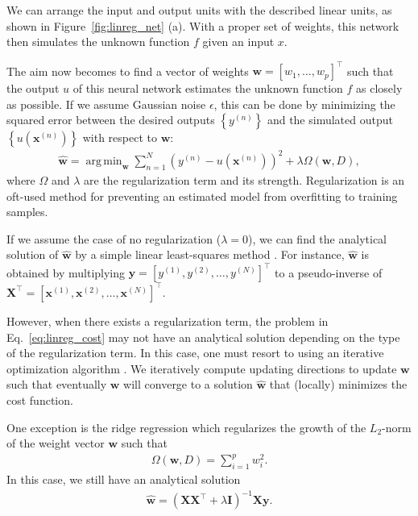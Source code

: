 \documentclass[dissertation,nocontribution,draft*]{aaltoseries}
\newcommand{\vect}[1]{\mathbf{#1}}
\newcommand{\matr}[1]{\mathbf{#1}}
\newcommand{\vx}[0]{\vect{x}}
\newcommand{\vy}[0]{\vect{y}}
\newcommand{\vw}[0]{\vect{w}}
\newcommand{\mX}[0]{\matr{X}}
\newcommand{\mI}{\matr{I}}
\DeclareMathOperator*{\argmin}{arg\,min}
\begin{document}
We can arrange the input and output units with the described
linear units, as shown in Figure~\ref{fig:linreg_net} (a). With
a proper set of weights, this network then simulates
the unknown function $f$ given an input $x$. 

The aim now becomes to find a vector of weights $\vw = [w_1,
\dots, w_p]^\top$ such that the output $u$ of this neural
network estimates the unknown function $f$ as closely as
possible. If we assume Gaussian noise $\epsilon$, this can
be done by minimizing the squared error between the desired
outputs $\left\{ y^{(n)} \right\}$ and the simulated output
$\left\{ u(\vx^{(n)}) \right\}$ with respect to $\vw$:
\begin{align}
    \label{eq:linreg_cost}
    \hat{\vw} = \argmin_{\vw} \sum_{n=1}^N \left( y^{(n)}
    - u\left(\vx^{(n)}\right) \right)^2 + \lambda \Omega
    \left(\vw, D\right),
\end{align}
where $\Omega$ and $\lambda$ are the regularization term and
its strength. Regularization is an oft-used method for
preventing an estimated model from overfitting to training
samples.

If we assume the case of no regularization ($\lambda = 0$),
we can find the analytical solution of $\hat{\vw}$ by a
simple linear least-squares method \citep[see,
e.g.,][]{Golub1996}.  For instance, $\hat{\vw}$ is obtained
by multiplying $\vy = \left[y^{(1)}, y^{(2)}, \dots, y^{(N)}
\right]^\top$ to a pseudo-inverse of $\mX^\top = \left[
\vx^{(1)}, \vx^{(2)}, \dots, \vx^{(N)}\right]^\top$. 

However, when there exists a regularization term, the
problem in Eq.~\eqref{eq:linreg_cost} may not
have an analytical solution depending on the type of the
regularization term. In this case, one must resort to
using an iterative optimization algorithm \citep[see,
e.g.,][]{Fletcher1987}. We iteratively compute updating
directions to update $\vw$ such that eventually $\vw$ will
converge to a solution $\hat{\vw}$ that (locally) minimizes
the cost function.

One exception is the ridge regression which regularizes the
growth of the $L_2$-norm of the weight vector $\vw$ such
that
\begin{align*}
    \Omega(\vw, D) = \sum_{i=1}^p w_i^2.
\end{align*}
In this case, we still have an analytical solution
\begin{align*}
    \hat{\vw} = \left( \mX \mX^\top + \lambda \mI
    \right)^{-1} \mX \vy.
\end{align*}
\end{document}
